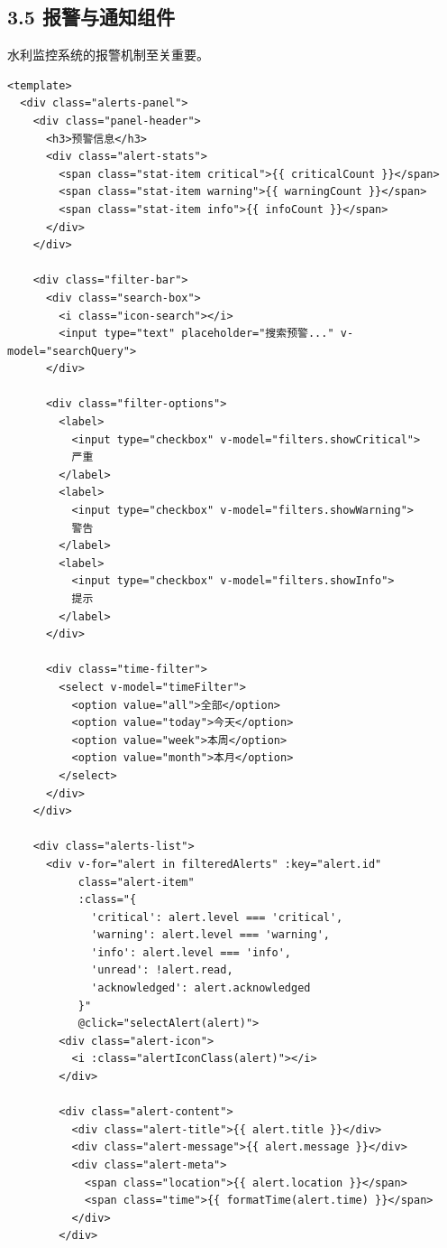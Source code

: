 \subsection{3.5
报警与通知组件}\label{ux62a5ux8b66ux4e0eux901aux77e5ux7ec4ux4ef6}

水利监控系统的报警机制至关重要。

\begin{lstlisting}
<template>
  <div class="alerts-panel">
    <div class="panel-header">
      <h3>预警信息</h3>
      <div class="alert-stats">
        <span class="stat-item critical">{{ criticalCount }}</span>
        <span class="stat-item warning">{{ warningCount }}</span>
        <span class="stat-item info">{{ infoCount }}</span>
      </div>
    </div>
    
    <div class="filter-bar">
      <div class="search-box">
        <i class="icon-search"></i>
        <input type="text" placeholder="搜索预警..." v-model="searchQuery">
      </div>
      
      <div class="filter-options">
        <label>
          <input type="checkbox" v-model="filters.showCritical">
          严重
        </label>
        <label>
          <input type="checkbox" v-model="filters.showWarning">
          警告
        </label>
        <label>
          <input type="checkbox" v-model="filters.showInfo">
          提示
        </label>
      </div>
      
      <div class="time-filter">
        <select v-model="timeFilter">
          <option value="all">全部</option>
          <option value="today">今天</option>
          <option value="week">本周</option>
          <option value="month">本月</option>
        </select>
      </div>
    </div>
    
    <div class="alerts-list">
      <div v-for="alert in filteredAlerts" :key="alert.id" 
           class="alert-item" 
           :class="{ 
             'critical': alert.level === 'critical',
             'warning': alert.level === 'warning',
             'info': alert.level === 'info',
             'unread': !alert.read,
             'acknowledged': alert.acknowledged
           }"
           @click="selectAlert(alert)">
        <div class="alert-icon">
          <i :class="alertIconClass(alert)"></i>
        </div>
        
        <div class="alert-content">
          <div class="alert-title">{{ alert.title }}</div>
          <div class="alert-message">{{ alert.message }}</div>
          <div class="alert-meta">
            <span class="location">{{ alert.location }}</span>
            <span class="time">{{ formatTime(alert.time) }}</span>
          </div>
        </div>
        

\end{lstlisting}
